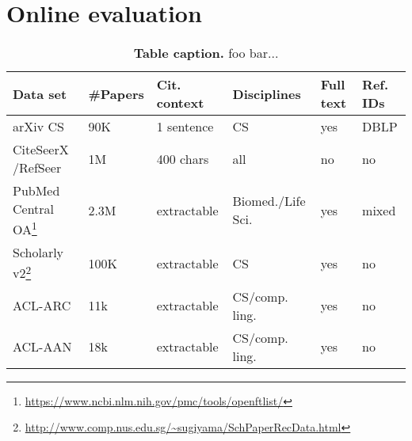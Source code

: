 \section{Online evaluation}
\begin{table}[ht]
\begin{center}
    \begin{tabular}{llllll}
    \toprule
    Data set & \#Papers & Cit. context & Disciplines & Full text & Ref. IDs \\
    \midrule
    arXiv CS    &  90K & 1 sentence & CS & yes & DBLP \\ %
    CiteSeerX /RefSeer  &  1M & 400 chars & all & no & no \\ %
    PubMed Central OA\footnote{\url{https://www.ncbi.nlm.nih.gov/pmc/tools/openftlist/}} & 2.3M & extractable & Biomed./Life Sci. & yes & mixed \\
    Scholarly v2\footnote{\url{http://www.comp.nus.edu.sg/~sugiyama/SchPaperRecData.html}}  & 100K & extractable & CS & yes & no \\
    ACL-ARC  & 11k & extractable & CS/comp. ling. & yes & no \\ %
    ACL-AAN  & 18k & extractable & CS/comp. ling. & yes & no  \\ %
    \bottomrule
    \end{tabular}
\end{center}
    \caption[Table caption]{\textbf{Table caption.} foo bar...\\}
    \label{tab:accuracy}
\end{table}

